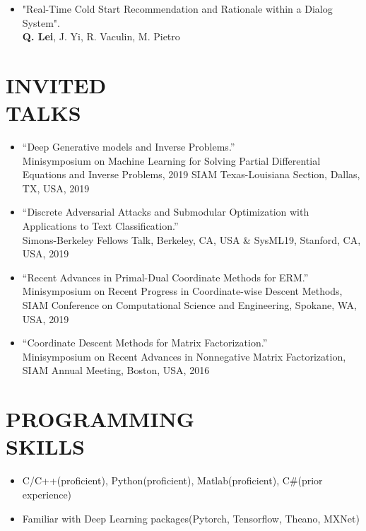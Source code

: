 \documentclass[margin, 10pt]{res} %
\begin{document}
\begin{resume}
\begin{itemize}
 \item{"Real-Time Cold Start Recommendation and Rationale within a Dialog System".\\
   \textbf{Q. Lei}, J. Yi, R. Vaculin, M. Pietro}
 \end{itemize}

 \section{INVITED\\TALKS}
 \begin{itemize}
   \item{``Deep Generative models and Inverse Problems.''\\
       Minisymposium on Machine Learning for Solving Partial Differential 
       Equations and Inverse Problems, 2019 SIAM Texas-Louisiana Section, Dallas,
 TX, USA, 2019}

 \item{``Discrete Adversarial Attacks 
 and Submodular Optimization with Applications to Text Classification.''\\ 
 Simons-Berkeley Fellows Talk, Berkeley, CA, USA \& SysML19, Stanford, CA, 
 USA, 2019}

 \item{``Recent 
     Advances in Primal-Dual Coordinate Methods for ERM.''\\
     Minisymposium on Recent Progress in Coordinate-wise Descent Methods, SIAM Conference on Computational Science and Engineering, Spokane, WA, USA, 2019}
 
 \item{``Coordinate Descent Methods for Matrix Factorization.''\\
   Minisymposium on Recent Advances in Nonnegative Matrix Factorization, SIAM 
 Annual Meeting, Boston, USA, 2016}


 \end{itemize}

\section{PROGRAMMING \\ SKILLS} 
\begin{itemize}
	\item[]  C/C++(proficient), Python(proficient), Matlab(proficient), C\#(prior experience)
  \item[]  Familiar with Deep Learning packages(Pytorch, Tensorflow, Theano, MXNet)
\end{itemize}

\end{resume}
\end{document}
